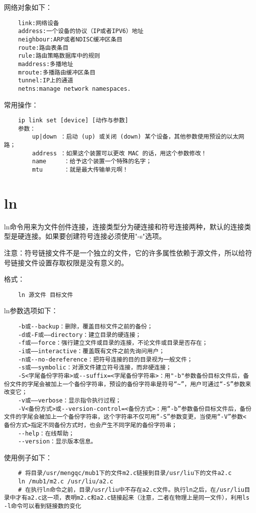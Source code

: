 \documentclass[a4paper,left=2.5cm,right=2.5cm,11pt]{article}
\begin{document}
	网络对象如下：
	\begin{lstlisting}
	link:网络设备
	address:一个设备的协议（IP或者IPV6）地址
	neighbour:ARP或者NDISC缓冲区条目
	route:路由表条目
	rule:路由策略数据库中的规则
	maddress:多播地址
	mroute:多播路由缓冲区条目
	tunnel:IP上的通道
	netns:manage network namespaces.
	\end{lstlisting}

	常用操作：
	\begin{lstlisting}
	ip link set [device] [动作与参数]
	参数：
		up|down ：启动 (up) 或关闭 (down) 某个设备，其他参数使用预设的以太网路；
		address ：如果这个装置可以更改 MAC 的话，用这个参数修改！
		name     ：给予这个装置一个特殊的名字；
		mtu      ：就是最大传输单元啊！
	\end{lstlisting}

\section{ln}
	ln命令用来为文件创件连接，连接类型分为硬连接和符号连接两种，默认的连接类型是硬连接。如果要创建符号连接必须使用"-s"选项。 \par
	注意：符号链接文件不是一个独立的文件，它的许多属性依赖于源文件，所以给符号链接文件设置存取权限是没有意义的。\par

	格式：
	\begin{lstlisting}
	ln 源文件 目标文件
	\end{lstlisting}

	ln参数选项如下：
	\begin{lstlisting}
	-b或--backup：删除，覆盖目标文件之前的备份； 
	-d或-F或——directory：建立目录的硬连接； 
	-f或——force：强行建立文件或目录的连接，不论文件或目录是否存在； 
	-i或——interactive：覆盖既有文件之前先询问用户； 
	-n或--no-dereference：把符号连接的目的目录视为一般文件； 
	-s或——symbolic：对源文件建立符号连接，而非硬连接； 
	-S<字尾备份字符串>或--suffix=<字尾备份字符串>：用"-b"参数备份目标文件后，备份文件的字尾会被加上一个备份字符串，预设的备份字符串是符号“~”，用户可通过“-S”参数来改变它； 
	-v或——verbose：显示指令执行过程； 
	-V<备份方式>或--version-control=<备份方式>：用“-b”参数备份目标文件后，备份文件的字尾会被加上一个备份字符串，这个字符串不仅可用“-S”参数变更，当使用“-V”参数<备份方式>指定不同备份方式时，也会产生不同字尾的备份字符串； 
	--help：在线帮助； 
	--version：显示版本信息。
	\end{lstlisting}

	使用例子如下：
	\begin{lstlisting}
	# 将目录/usr/mengqc/mub1下的文件m2.c链接到目录/usr/liu下的文件a2.c
	ln /mub1/m2.c /usr/liu/a2.c
	# 在执行ln命令之前，目录/usr/liu中不存在a2.c文件。执行ln之后，在/usr/liu目录中才有a2.c这一项，表明m2.c和a2.c链接起来（注意，二者在物理上是同一文件），利用ls -l命令可以看到链接数的变化
	\end{lstlisting}
\end{document}
